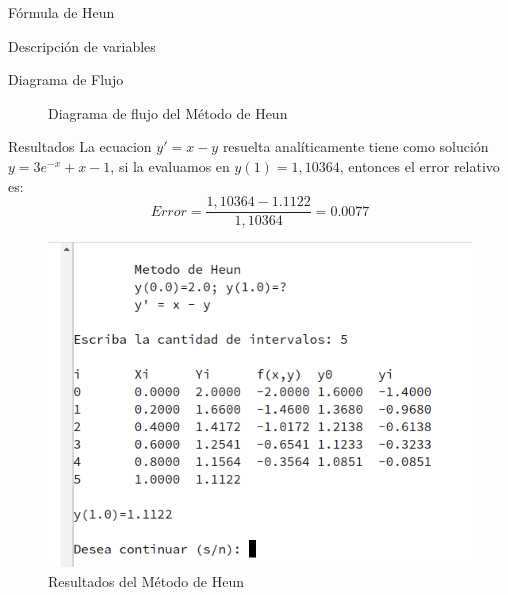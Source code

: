 \documentclass[letterpaper, 12pt]{article}
\begin{document}
\begin{section}{Fórmula de Heun}
\begin{subsection}{Descripción de variables}
\begin{table}[h]
        \caption{Fórmula de Heun: Variables utilizadas}
      \end{table}
    \end{subsection}
    \newpage
    \begin{subsection}{Diagrama de Flujo}
      \begin{figure}[h]
        \centering
        
        \caption{Diagrama de flujo del Método de Heun}
      \end{figure}
    \end{subsection}
    \newpage
    \begin{subsection}{Resultados}
      La ecuacion $y' = x -y$ resuelta analíticamente tiene como solución $y = 3e^{-x} +x -1$, si la evaluamos en $y(1)=1,10364$, entonces el error relativo es:
      \[Error = \frac{1,10364 - 1.1122}{1,10364} = 0.0077\]
      \begin{figure}[h]
        \centering
        \includegraphics[scale=1.0]{Heun.png}
        \caption{Resultados del Método de Heun}
      \end{figure}
    \end{subsection}
  \end{section}
  \newpage
\end{document}
